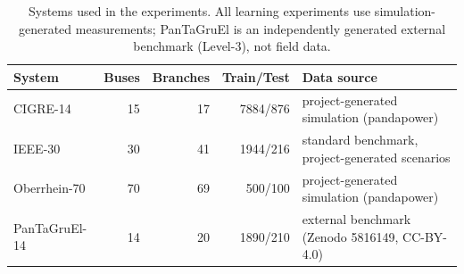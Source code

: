 \begin{table}[htbp]
\centering
\caption{Systems used in the experiments. All learning experiments use simulation-generated measurements; PanTaGruEl is an independently generated external benchmark (Level-3), not field data.}
\label{tab:datasets}
\footnotesize
\begin{tabular}{lrrrl}
\toprule
System & Buses & Branches & Train/Test & Data source \\
\midrule
CIGRE-14 & 15 & 17 & 7884/876 & project-generated simulation (pandapower) \\
IEEE-30 & 30 & 41 & 1944/216 & standard benchmark, project-generated scenarios \\
Oberrhein-70 & 70 & 69 & 500/100 & project-generated simulation (pandapower) \\
PanTaGruEl-14 & 14 & 20 & 1890/210 & external benchmark (Zenodo 5816149, CC-BY-4.0) \\
\bottomrule
\end{tabular}
\end{table}

